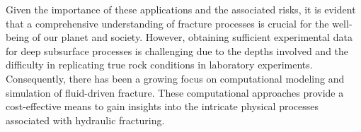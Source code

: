 Given the importance of these applications and the associated risks, it is evident that a comprehensive understanding of fracture processes is crucial for the well-being of our planet and society. However, obtaining sufficient experimental data for deep subsurface processes is challenging due to the depths involved and the difficulty in replicating true rock conditions in laboratory experiments. Consequently, there has been a growing focus on computational modeling and simulation of fluid-driven fracture. These computational approaches provide a cost-effective means to gain insights into the intricate physical processes associated with hydraulic fracturing.


